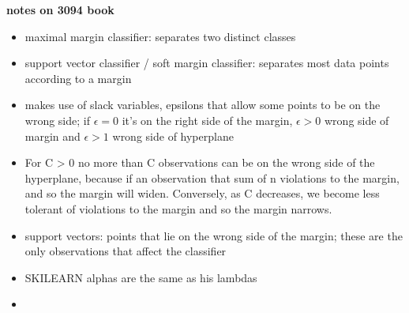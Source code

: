 \documentclass{article}
\begin{document}
\textbf{notes on 3094 book}
\begin{itemize}
    \item maximal margin classifier: separates two distinct classes
    \item support vector classifier / soft margin classifier: separates most data points according to a margin
    \item makes use of slack variables, epsilons that allow some points to be on the wrong side; if $\epsilon=0$ it's on the right side of the margin, $\epsilon>0$ wrong side of margin and $\epsilon>1$ wrong side of hyperplane
    \item For C > 0 no more than C observations can be on the wrong side of the hyperplane, because if an observation
that sum of n
violations to the margin, and so the margin will widen. Conversely, as C
decreases, we become less tolerant of violations to the margin and so the
margin narrows.
    \item support vectors: points that lie on the wrong side of the margin; these are the only observations that affect the classifier
\end{itemize}

\begin{itemize}
    \item SKILEARN alphas are the same as his lambdas
    \item 
\end{itemize}
\end{document}
